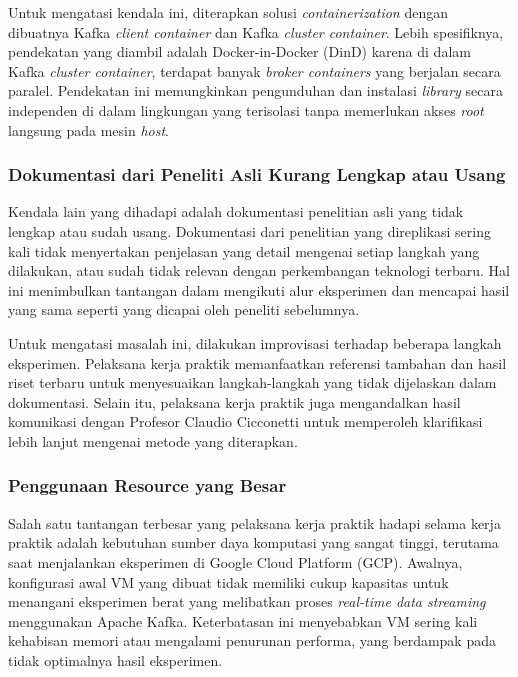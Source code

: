 Untuk mengatasi kendala ini, diterapkan solusi \textit{containerization} dengan dibuatnya Kafka \textit{client container} dan Kafka \textit{cluster container}. Lebih spesifiknya, pendekatan yang diambil adalah Docker-in-Docker (DinD) karena di dalam Kafka \textit{cluster container}, terdapat banyak \textit{broker containers} yang berjalan secara paralel. Pendekatan ini memungkinkan pengunduhan dan instalasi \textit{library} secara independen di dalam lingkungan yang terisolasi tanpa memerlukan akses \textit{root} langsung pada mesin \textit{host}.

\subsubsection{Dokumentasi dari Peneliti Asli Kurang Lengkap atau Usang}

Kendala lain yang dihadapi adalah dokumentasi penelitian asli yang tidak lengkap atau sudah usang. Dokumentasi dari penelitian yang direplikasi sering kali tidak menyertakan penjelasan yang detail mengenai setiap langkah yang dilakukan, atau sudah tidak relevan dengan perkembangan teknologi terbaru. Hal ini menimbulkan tantangan dalam mengikuti alur eksperimen dan mencapai hasil yang sama seperti yang dicapai oleh peneliti sebelumnya.

Untuk mengatasi masalah ini, dilakukan improvisasi terhadap beberapa langkah eksperimen. Pelaksana kerja praktik memanfaatkan referensi tambahan dan hasil riset terbaru untuk menyesuaikan langkah-langkah yang tidak dijelaskan dalam dokumentasi. Selain itu, pelaksana kerja praktik juga mengandalkan hasil komunikasi dengan Profesor Claudio Cicconetti untuk memperoleh klarifikasi lebih lanjut mengenai metode yang diterapkan.

\subsubsection{Penggunaan Resource yang Besar}

Salah satu tantangan terbesar yang pelaksana kerja praktik hadapi selama kerja praktik adalah kebutuhan sumber daya komputasi yang sangat tinggi, terutama saat menjalankan eksperimen di Google Cloud Platform (GCP). Awalnya, konfigurasi awal VM yang dibuat tidak memiliki cukup kapasitas untuk menangani eksperimen berat yang melibatkan proses \textit{real-time data streaming} menggunakan Apache Kafka. Keterbatasan ini menyebabkan VM sering kali kehabisan memori atau mengalami penurunan performa, yang berdampak pada tidak optimalnya hasil eksperimen.

